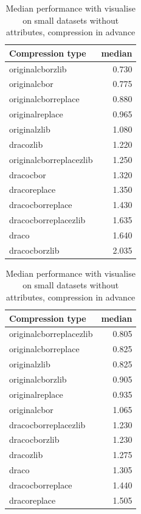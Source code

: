 \begin{table}[!h]
    \begin{minipage}{.5\linewidth}
      \caption{
Median performance with visualise on small datasets, compression in advance}
\centering

\begin{tabular}{|l|r|}
\hline
Compression type & median\\
\hline
originalcborzlib & 0.730\\
\hline
originalcbor & 0.775\\
\hline
originalcborreplace & 0.880\\
\hline
originalreplace & 0.965\\
\hline
originalzlib & 1.080\\
\hline
dracozlib & 1.220\\
\hline
originalcborreplacezlib & 1.250\\
\hline
dracocbor & 1.320\\
\hline
dracoreplace & 1.350\\
\hline
dracocborreplace & 1.430\\
\hline
dracocborreplacezlib & 1.635\\
\hline
draco & 1.640\\
\hline
dracocborzlib & 2.035\\
\hline
\end{tabular}
\end{minipage}%
    \begin{minipage}{.5\linewidth}
      \centering
        \caption{
Median performance with visualise on small datasets without attributes, compression in advance}

\begin{tabular}{|l|r|}
\hline
Compression type & median\\
\hline
originalcborreplacezlib & 0.805\\
\hline
originalcborreplace & 0.825\\
\hline
originalzlib & 0.825\\
\hline
originalcborzlib & 0.905\\
\hline
originalreplace & 0.935\\
\hline
originalcbor & 1.065\\
\hline
dracocborreplacezlib & 1.230\\
\hline
dracocborzlib & 1.230\\
\hline
dracozlib & 1.275\\
\hline
draco & 1.305\\
\hline
dracocborreplace & 1.440\\
\hline
dracoreplace & 1.505\\
\hline
\end{tabular}
\end{minipage} 
\end{table}

